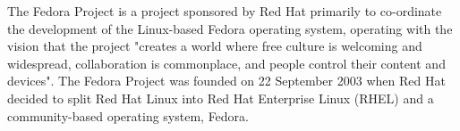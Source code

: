 \documentclass{article}
\begin{document}
 
The Fedora Project is a project sponsored by Red Hat primarily to co-ordinate the development of the Linux-based Fedora operating system, operating with the vision that the project "creates a world where free culture is welcoming and widespread, collaboration is commonplace, and people control their content and devices". The Fedora Project was founded on 22 September 2003 when Red Hat decided to split Red Hat Linux into Red Hat Enterprise Linux (RHEL) and a community-based operating system, Fedora. 
\end{document}
